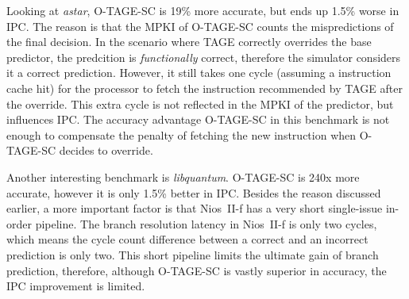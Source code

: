 Looking at \textit{astar}, \mbox{O-TAGE-SC} is 19\% more accurate, but ends up 1.5\% worse in IPC. The reason is that the MPKI of \mbox{O-TAGE-SC} counts the mispredictions of the final decision. In the scenario where TAGE correctly overrides the base predictor, the predcition is \textit{functionally} correct, therefore the simulator considers it a correct prediction. However, it still takes one cycle (assuming a instruction cache hit) for the processor to fetch the instruction recommended by TAGE after the override. This extra cycle is not reflected in the MPKI of the predictor, but influences IPC. The accuracy advantage \mbox{O-TAGE-SC} in this benchmark is not enough to compensate the penalty of fetching the new instruction when \mbox{O-TAGE-SC} decides to override.

Another interesting benchmark is \textit{libquantum}. \mbox{O-TAGE-SC} is \mytilde240x more accurate, however it is only 1.5\% better in IPC. Besides the reason discussed earlier, a more important factor is that Nios~II-f has a very short single-issue in-order pipeline. The branch resolution latency in Nios~II-f is only two cycles, which means the cycle count difference between a correct and an incorrect prediction is only two. This short pipeline limits the ultimate gain of branch prediction, therefore, although \mbox{O-TAGE-SC} is vastly superior in accuracy, the IPC improvement is limited.











